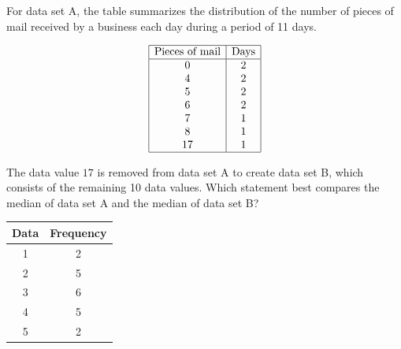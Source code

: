 \vspace{2em}

\noindent\markforreview
\vspace{1em}
\vspace{1em}

For data set A, the table summarizes the distribution of the number of pieces of mail received by a business each day during a period of 11 days.

\[
\begin{array}{|c|c|}
\hline
\text{Pieces of mail} & \text{Days} \\
\hline
0 & 2 \\
4 & 2 \\
5 & 2 \\
6 & 2 \\
7 & 1 \\
8 & 1 \\
17 & 1 \\
\hline
\end{array}
\]

The data value $17$ is removed from data set A to create data set B, which consists of the remaining 10 data values.  
Which statement best compares the median of data set A and the median of data set B?

\vspace{0.75em}


\vspace{2em}
\newpage

\newpage

\noindent\markforreview
\vspace{1em}
\vspace{1em}

\vspace{1em}

\begin{center}
\begin{tabular}{|c|c|}
\hline
\textbf{Data} & \textbf{Frequency}\\
\hline
1 & 2\\
2 & 5\\
3 & 6\\
4 & 5\\
5 & 2\\
\hline
\end{tabular}
\end{center}

